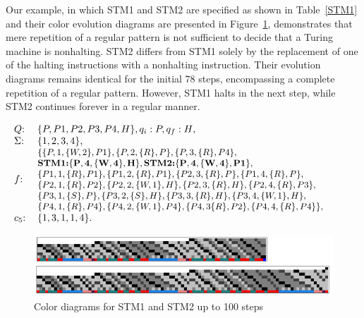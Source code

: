 \documentclass[%
  manuscript=article,   %
  year=2024,
  volume=77,
  doi=10.59203/zfn.77.694,
]{zfn}
\begin{document}
Our example, in which STM1 and STM2 are specified as shown in Table~\ref{STM1} and their color evolution diagrams are presented in Figure~\ref{STM12}, demonstrates that mere repetition of a regular pattern is not sufficient to decide that a Turing machine is nonhalting. STM2 differs from STM1 solely by the replacement of one of the halting instructions with a nonhalting instruction. Their evolution diagrams remains identical for the initial 78 steps, encompassing a complete repetition of a regular pattern. However, 
STM1 halts in the next step, while STM2 continues forever in a regular manner.

\begin{table}
\begin{eqnarray}
\hspace{-0.5cm}& \begin{tabular}{ll}
$Q$: & $\{P,P1,P2,P3,P4,H\}, q_{i}: P, q_{f}: H$,\\
$\Sigma$: & $\{1,2,3,4\}$,\\
$f$: & \hspace{-0.2cm}\begin{small}\begin{tabular}{l}$\{\{P,1,\{W,2\}, P1\},\{P,2,\{R\},P\},\{P,3,\{R\},P4\},$\\
${\bf \mbox{\bf STM1:} \{P,4,\{W,4\},H\}, \mbox{\bf STM2:} \{P,4,\{W,4\},P1\}}$,\\
$\{P1,1,\{R\},P1\},\{P1,2,\{R\},P1\},\{P2,3,\{R\},P\},\{P1,4,\{R\},P\},$\\
$\{P2,1,\{R\},P2\},\{P2,2,\{W,1\},H\},\{P2,3,\{R\},H\},\{P2,4,\{R\},P3\}$,\\
$\{P3,1,\{S\},P\}, \{P3,2,\{S\},H\}, \{P3,3,\{R\},H\},\{P3,4,\{W,1\},H\},$\\
$\{P4,1,\{R\},P4\},\{P4,2,\{W,1\},P4\}, \{P4,3\{R\},P2\}, \{P4,4,\{R\},P4\}\},$
\end{tabular}\end{small}\\
$c_{5}$: & $\{1,3,1,1,4\}$.
\end{tabular} & \nonumber 
\end{eqnarray}
\caption{STM1 (halting) and STM2 (not halting), differing by one instruction  \label{STM1}}
\end{table}

\begin{figure}
    \centering
    \includegraphics[width=12.5cm]{ART_Lampert/STM12.png}
\caption{Color diagrams for STM1 and STM2 up to 100 steps}
    \label{STM12}
\end{figure}
\end{document}
